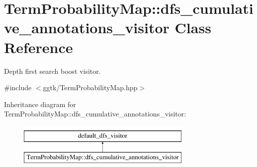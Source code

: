 \hypertarget{classTermProbabilityMap_1_1dfs__cumulative__annotations__visitor}{}\section{Term\+Probability\+Map\+:\+:dfs\+\_\+cumulative\+\_\+annotations\+\_\+visitor Class Reference}
\label{classTermProbabilityMap_1_1dfs__cumulative__annotations__visitor}


Depth first search boost visitor.  




{\ttfamily \#include $<$ggtk/\+Term\+Probability\+Map.\+hpp$>$}

Inheritance diagram for Term\+Probability\+Map\+:\+:dfs\+\_\+cumulative\+\_\+annotations\+\_\+visitor\+:\begin{figure}[H]
\begin{center}
\leavevmode
\includegraphics[height=2.000000cm]{classTermProbabilityMap_1_1dfs__cumulative__annotations__visitor}
\end{center}
\end{figure}
